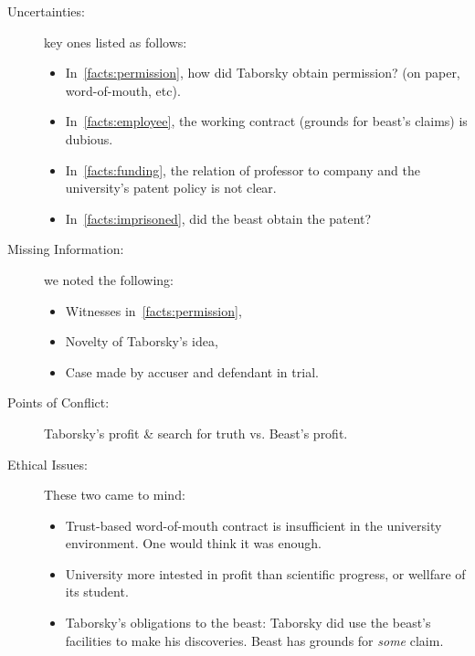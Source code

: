 \documentclass[draft,11pt,openright,monochrome,british,a4paper]{scrartcl}
\begin{document}
\begin{description}
  \item[Uncertainties:]key ones listed as follows:
    \begin{itemize}
    \item In~\ref{facts:permission}, how did Taborsky obtain
      permission? (on paper, word-of-mouth, etc).
    \item In~\ref{facts:employee}, the working contract (grounds for beast's claims) is dubious.
    \item In~\ref{facts:funding}, the relation of professor to
      company and the university's patent policy is not clear.
    \item In~\ref{facts:imprisoned}, did the beast obtain the patent?
    \end{itemize}
  \item[Missing Information:]we noted the following:
    \begin{itemize}
    \item Witnesses in~\ref{facts:permission},
    \item Novelty of Taborsky's idea,
    \item Case made by accuser and defendant in trial.
    \end{itemize}
  \item[Points of Conflict:]Taborsky's profit \& search for truth vs. Beast's profit.
  \item[Ethical Issues:]These two came to mind:
    \begin{itemize}
    \item Trust-based word-of-mouth contract is insufficient in the
      university environment. One would think it was enough.
    \item University more intested in profit than scientific progress,
      or wellfare of its student.
    \item Taborsky's obligations to the beast: Taborsky did use the
      beast's facilities to make his discoveries. Beast has grounds
      for \emph{some} claim.
    \end{itemize}
\end{description}
\end{document}
